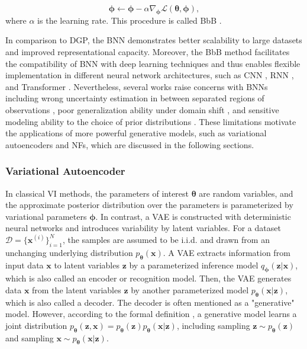 \begin{equation}
    \boldsymbol{\phi}\leftarrow\boldsymbol{\phi}-\alpha\nabla_{\boldsymbol{\phi}}\mathcal{L}(\boldsymbol{\theta}, \boldsymbol{\phi}),
\end{equation}
where $\alpha$ is the learning rate. This procedure is called \ac{BbB} \citep{blundell2015bbb}.

In comparison to \ac{DGP}, the \ac{BNN} demonstrates better scalability to large datasets and improved representational capacity. Moreover, the \ac{BbB} method facilitates the compatibility of \ac{BNN} with deep learning techniques and thus enables flexible implementation in different neural network architectures, such as \ac{CNN} \citep{shridhar2019bcnn}, \ac{RNN} \citep{fortunato2019brnn}, and Transformer \citep{müller2024transbi}. Nevertheless, several works raise concerns with BNNs including wrong uncertainty estimation in between separated regions of observations \citep{foong2019inbetween, foong2020bnn}, poor generalization ability under domain shift \citep{izmailov2021bnnp}, and sensitive modeling ability to the choice of prior distributions \citep{silvestro2020prior}. These limitations motivate the applications of more powerful generative models, such as variational autoencoders and \acp{NF}, which are discussed in the following sections.

\subsubsection{Variational Autoencoder}
In classical \ac{VI} methods, the parameters of interest $\boldsymbol{\theta}$ are random variables, and the approximate posterior distribution over the parameters is parameterized by variational parameters $\boldsymbol{\phi}$. In contrast, a \acf{VAE} is constructed with deterministic neural networks and introduces variability by latent variables. For a dataset $\mathcal{D}=\{\boldsymbol{x}^{(i)}\}_{i=1}^{N}$, the samples are assumed to be \ac{i.i.d.} and drawn from an unchanging underlying distribution $p_{\boldsymbol{\theta}}(\boldsymbol{x})$. A \ac{VAE} extracts information from input data $\boldsymbol{x}$ to latent variables $\boldsymbol{z}$ by a parameterized inference model $q_{\boldsymbol{\phi}}(\boldsymbol{z}|\boldsymbol{x})$, which is also called an encoder or recognition model. Then, the \ac{VAE} generates data $\boldsymbol{x}$ from the latent variables $\boldsymbol{z}$ by another parameterized model $p_{\boldsymbol{\theta}}(\boldsymbol{x}|\boldsymbol{z})$, which is also called a decoder. The decoder is often mentioned as a "generative" model. However, according to the formal definition \citep{Kingma_2019}, a generative model learns a joint distribution $p_{\boldsymbol{\theta}}(\boldsymbol{z}, \boldsymbol{x})=p_{\boldsymbol{\theta}}(\boldsymbol{z})p_{\boldsymbol{\theta}}(\boldsymbol{x}|\boldsymbol{z})$, including sampling $\boldsymbol{z}\sim p_{\boldsymbol{\theta}}(\boldsymbol{z})$ and sampling $\boldsymbol{x}\sim p_{\boldsymbol{\theta}}(\boldsymbol{x}|\boldsymbol{z})$. 

